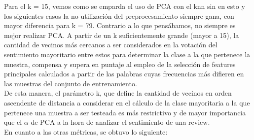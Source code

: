 Para el k = 15, vemos como se emparda el uso de PCA con el knn sin en esto y los siguientes casos la no utilización del preprocesamiento siempre gana, con mayor diferencia para k = 79. 
Contrario a lo que pensábamos, no siempre es mejor realizar PCA.
A partir de un k suficientemente grande (mayor a 15), la cantidad de vecinos más cercanos a ser considerados en la votación del sentimiento mayoritario entre estos para determinar la clase a la que pertenece la muestra, compensa y supera en puntaje al empleo de la selección de features principales calculados a partir de las palabras cuyas frecuencias más difieren en las muestras del conjunto de entrenamiento.\\
De esta manera, el parámetro k, que define la cantidad de vecinos en orden ascendente de distancia a considerar en el cálculo de la clase mayoritaria a la que pertenece una muestra a ser testeada es más restrictivo y de mayor importancia que el $\alpha$ de PCA a la hora de analizar el sentimiento de una review. \\

En cuanto a las otras métricas, se obtuvo lo siguiente:

